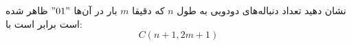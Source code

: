 \EXERCISE
نشان دهید تعداد دنباله‌های دودویی به طول
$n$
که دقیقا
$m$
بار در آن‌ها
$"01"$
ظاهر شده است برابر است با:
$$C(n + 1, 2m + 1)$$
